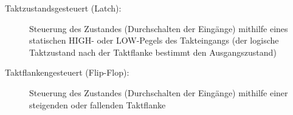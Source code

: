 \begin{description}
  \item[Taktzustandsgesteuert (Latch):]
    Steuerung des Zustandes (Durchschalten der Eingänge) mithilfe eines
    statischen HIGH- oder LOW-Pegels des Takteingangs (der logische Taktzustand
    nach der Taktflanke bestimmt den Ausgangszustand)
  \item[Taktflankengesteuert (Flip-Flop):]
    Steuerung des Zustandes (Durchschalten der Eingänge) mithilfe einer steigenden oder fallenden Taktflanke
\end{description}
